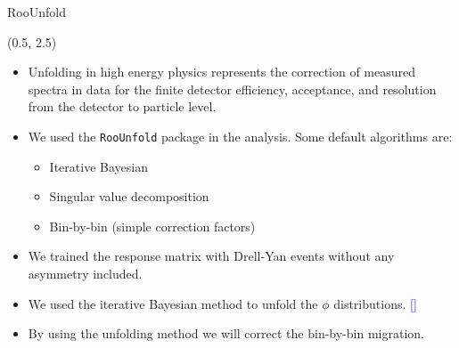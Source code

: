 \documentclass[11pt, xcolor={dvipsnames}, aspectratio = 169]{beamer}
\newcommand{\citeme}[1]{{\tiny \textcolor{blue}{[\fullcite{#1}]}}}
\begin{document}
\begin{frame}[fragile]{RooUnfold}

\begin{textblock}{14.0}(0.5, 2.5)

\begin{itemize}

\item Unfolding in high energy physics represents the correction of measured spectra in data for the finite detector efficiency, acceptance, and resolution from the detector to particle level.

\item We used the \verb|RooUnfold| package in the analysis. Some default algorithms are:

\begin{itemize}
    \item Iterative Bayesian
    \item Singular value decomposition
    \item Bin-by-bin (simple correction factors)
\end{itemize}

\item We trained the response matrix with Drell-Yan events without any asymmetry included.

\item We used the iterative Bayesian method to unfold the $\phi$ distributions. \citeme{Wynne:2012jb}

\item By using the unfolding method we will correct the bin-by-bin migration.

\end{itemize}

\end{textblock}

\end{frame}
\end{document}
